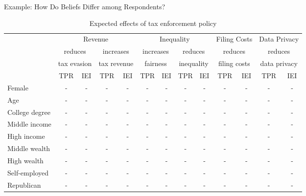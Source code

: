 \documentclass{beamer}
\begin{document}
\begin{frame}{Example: How Do Beliefs Differ among Respondents?}
\label{Example:ExpectedEffects}
\begin{table}[!htbp]\centering
\tiny
\caption{Expected effects of tax enforcement policy}
\begin{threeparttable}
\begin{tabular}{l|cc|cc|cc|cc|cc|cc}
\toprule
 & \multicolumn{4}{c|}{Revenue} & \multicolumn{4}{c|}{Inequality} & \multicolumn{2}{c|}{Filing Costs} & \multicolumn{2}{c}{Data Privacy}\\[0.5em]
 & \multicolumn{2}{c|}{reduces}  & \multicolumn{2}{c|}{increases}& \multicolumn{2}{c|}{increases} & \multicolumn{2}{c|}{reduces}  & \multicolumn{2}{c|}{reduces} & \multicolumn{2}{c}{reduces} \\
 & \multicolumn{2}{c|}{tax evasion}  & \multicolumn{2}{c|}{tax revenue} & \multicolumn{2}{c|}{fairness} & \multicolumn{2}{c|}{inequality}& \multicolumn{2}{c|}{filing costs} & \multicolumn{2}{c}{data privacy}  \\[0.5em]
  & TPR & IEI  & TPR & IEI & TPR & IEI & TPR & IEI & TPR & IEI & TPR & IEI  \\
\midrule
Female                     &-& - & - &-& - & -& - &-& - & -& - &- \\
Age                        &-& - & - &-& - & -& - &-& - & -& - &- \\
College degree             &-& - & - &-& - & -& - &-& - & -& - &- \\
Middle income              &-& - & - &-& - & -& - &-& - & -& - &- \\
High income                &-& - & - &-& - & -& - &-& - & -& - &- \\
Middle wealth              &-& - & - &-& - & -& - &-& - & -& - &- \\
High wealth                &-& - & - &-& - & -& - &-& - & -& - &- \\
Self-employed              &-& - & - &-& - & -& - &-& - & -& - &- \\
Republican                 &-& - & - &-& - & -& - &-& - & -& - &- \\[1em]


\end{tabular}
\end{threeparttable}
\end{table}
\end{frame}
\end{document}
